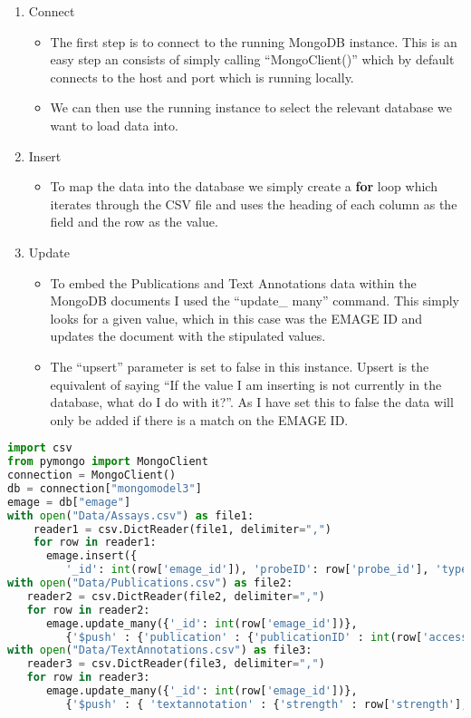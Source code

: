 \begin{enumerate}
\item Connect
\begin{itemize}
\item The first step is to connect to the running MongoDB instance. This is an easy step an consists of simply calling ``MongoClient()'' which by default connects to the host and port which is running locally.
\item We can then use the running instance to select the relevant database we want to load data into.
\end{itemize}
\item Insert
\begin{itemize}
\item To map the data into the database we simply create a \textbf{for} loop which iterates through the CSV file and uses the heading of each column as the field and the row as the value.
\end{itemize}
\item Update
\begin{itemize}
\item To embed the Publications and Text Annotations data within the MongoDB documents I used the ``update\_ many'' command. This simply looks for a given value, which in this case was the EMAGE ID and updates the document with the stipulated values.
\item The ``upsert'' parameter is set to false in this instance. Upsert is the equivalent of saying ``If the value I am inserting is not currently in the database, what do I do with it?''. As I have set this to false the data will only be added if there is a match on the EMAGE ID.
\end{itemize}
\end{enumerate}
\begin{lstlisting}[language=Python, caption=PyMongo script implemented to load data into MongoDB., label=code:pymongo]
import csv
from pymongo import MongoClient
connection = MongoClient()
db = connection["mongomodel3"]
emage = db["emage"]
with open("Data/Assays.csv") as file1:
    reader1 = csv.DictReader(file1, delimiter=",")
    for row in reader1:
      emage.insert({
         '_id': int(row['emage_id']), 'probeID': row['probe_id'], 'type': row['assay_type'], 'source': row['name'], 'specimen' : {'type':row['type'],'strain' : row['strain']}, 'stage' : {'theilerstage' : int(row['theilerstage']),'dpc' : row['dpc']}})
with open("Data/Publications.csv") as file2:
   reader2 = csv.DictReader(file2, delimiter=",")
   for row in reader2:
      emage.update_many({'_id': int(row['emage_id'])},
         {'$push' : {'publication' : {'publicationID' : int(row['accession']), 'title' : row['title'], 'author' : row['author']}}}, upsert=False)
with open("Data/TextAnnotations.csv") as file3:
   reader3 = csv.DictReader(file3, delimiter=",")
   for row in reader3:
      emage.update_many({'_id': int(row['emage_id'])},
         {'$push' : { 'textannotation' : {'strength' : row['strength'], 'anatomystructure' : {'structureID' : int(row['EMAPA']),'term' : row['term']}, 'gene' : {'geneID' : row['accession'],'name' : row['name']}}}}, upsert=False)
\end{lstlisting}

